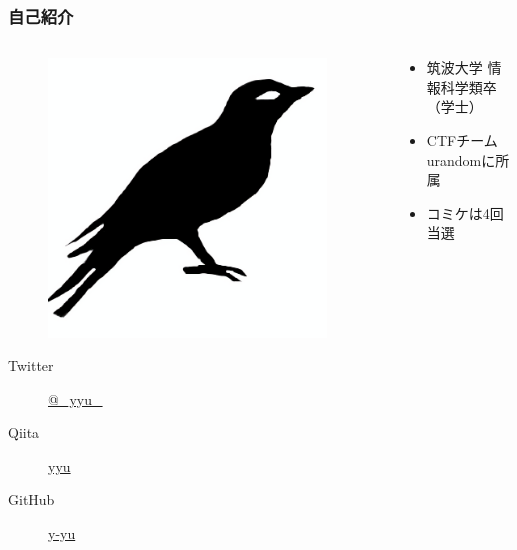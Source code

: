 \begin{frame}
  \frametitle{自己紹介}
  
  \begin{columns}
    \begin{column}{0.3\textwidth}
      \centering
      \begin{figure}
        \includegraphics[width=0.95\textwidth]{img/bird2x.png}
      \end{figure}

      \begin{description}
        \item[Twitter] \href{https://twitter.com/\_yyu\_}{@\_yyu\_}
        \item[Qiita] \href{http://qiita.com/yyu}{yyu}
        \item[GitHub] \href{https://github.com/y-yu}{y-yu}
      \end{description}
    \end{column}
    \begin{column}{0.7\textwidth}
      \begin{itemize}
        \item<2-> 筑波大学 情報科学類卒（学士）
        \item<3-> CTFチームurandomに所属
        \item<4-> コミケは4回当選
      \end{itemize}
    \end{column}
  \end{columns}
\end{frame}

